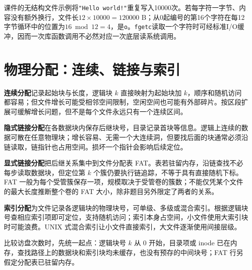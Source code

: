 课件的无结构文件示例将\texttt{"Hello world!"}重复写入10000次。若每字符一字节、内容没有额外换行，文件长\(12\times10000=120000\) B；从0起编号的第16个字符在每12字节循环中的位置为\(16\bmod12=4\)，是\texttt{o}。\texttt{fgetc}读取一个字符时可经标准I/O缓冲，因而一次库函数调用不必然对应一次底层读系统调用。

\section{物理分配：连续、链接与索引}\label{OS04-6-5}

\textbf{连续分配}记录起始块与长度，逻辑块 \(k\) 直接映射为起始块加 \(k\)，顺序和随机访问都容易；但文件增长可能受相邻空间限制，空闲空间也可能有外部碎片。按区段扩展可缓解增长问题，但不是每个文件永远只有一个连续区间。

\textbf{隐式链接分配}在各数据块内保存后继块号，目录记录首块等信息。逻辑上连续的数据可散在任意物理块；增长容易、无需一个大连续洞，但要找后面的块通常必须沿链读取，链指针也占用空间。损坏一个指针会影响后续定位。

\textbf{显式链接分配}把后继关系集中到文件分配表 FAT。表若驻留内存，沿链查找不必每步读取数据块，但定位第 \(k\) 个簇仍要执行链追踪，不等于具有直接随机下标。FAT 一般为每个受管簇保存一项，规模取决于受管卷的簇数；不能仅凭某个文件的最大长度推断整个卷的 FAT 大小，除非题目另外限定了两者的关系。

\textbf{索引分配}为文件记录各逻辑块的物理块号，可单级、多级或混合索引。根据逻辑块号查相应索引项即可定位，支持随机访问；索引本身占空间，小文件使用大索引块时可能浪费。UNIX 式混合索引让小文件直接索引，大文件逐渐使用间接层级。

比较访盘次数时，先统一起点：逻辑块号 \(k\) 从 0 开始，目录项或 inode 已在内存，查找路径上的数据块和索引块均未缓存，也没有预存的中间块号；FAT 行另假定分配表已驻留内存。

